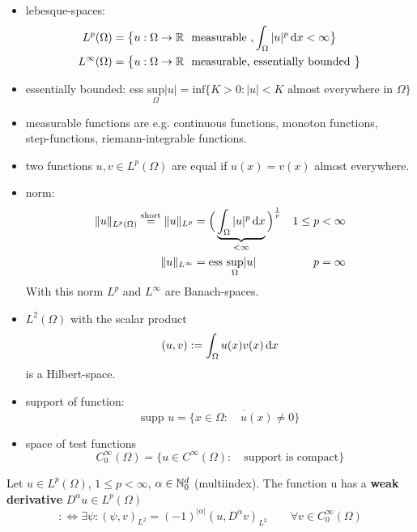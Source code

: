 	\begin{itemize}
		\item lebesque-spaces: 
		\begin{align*}
		L^p(\Omega) &= \big\{ u: \Omega \to \mathbb{R} \ \text{ measurable } , \int_\Omega |u|^p \mathop{}\!\mathrm{d} x < \infty \big\}  \\
		L^\infty(\Omega) &= \big\{ u: \Omega \to \mathbb{R} \ \text{ measurable, essentially bounded } \big\}
		\end{align*}
		\item essentially bounded: ess $ \underset{\Omega}{\text{sup}} |u| = \text{inf}\big\{ K >0 : |u|<K \text{ almost everywhere in } \Omega \big\}  $
		
		\item measurable functions are e.g. continuous functions, monoton functions,\\ step-functions, riemann-integrable functions.
		\item two functions $u,v \in L^p(\Omega)$ are equal if $u(x) = v(x)$ almost everywhere.
		\item norm: 
		\begin{align*}
			\|u\|_{L^p(\Omega)} \overset{\text{short}}{=}\|u\|_{L^p} &= \Big (\underbrace{ \int_\Omega |u|^p \mathop{}\!\mathrm{d} x}_{ < \infty} \Big )^{\frac{1}{p} } & 1 \leq p&<\infty \\
		\|u\|_{L^\infty} &= \text{ess }\underset{\Omega}{\text{sup}} |u| & p&= \infty 
		\end{align*}
		With this norm $L^p$ and $L^\infty$ are Banach-spaces.
		\item $L^2(\Omega)$ with the scalar product
		\begin{equation*}
		(u,v) := \int_\Omega u(x)v(x) \mathop{}\!\mathrm{d} x 
		\end{equation*}
		is a Hilbert-space.
		\item support of function:
		\begin{equation*}
		\text{supp }u  = \overline{\big \{ x \in \Omega:\quad u(x)\neq0  \big \}} 
		\end{equation*}
		\item space of test functions
		\begin{equation*}
		C^\infty_0(\Omega) = \big \{ u \in C^\infty(\Omega):\quad \text{support is compact}  \big\}
		\end{equation*}
	\end{itemize}

\begin{defi}
Let $ u \in L^p(\Omega)$, $1 \leq p< \infty$, $\alpha \in \mathbb{N}^d_0$ (multiindex).\enter
The function u has a \textbf{weak derivative} $ D^\alpha u \in L^p(\Omega) $ 
\begin{equation*}
	:\iff \exists \psi: (\psi,v)_{L^2} = (-1)^{|\alpha|} (u,D^\alpha v)_{L^2} \qquad \forall v \in C^\infty_0(\Omega)
\end{equation*}
\end{defi}

